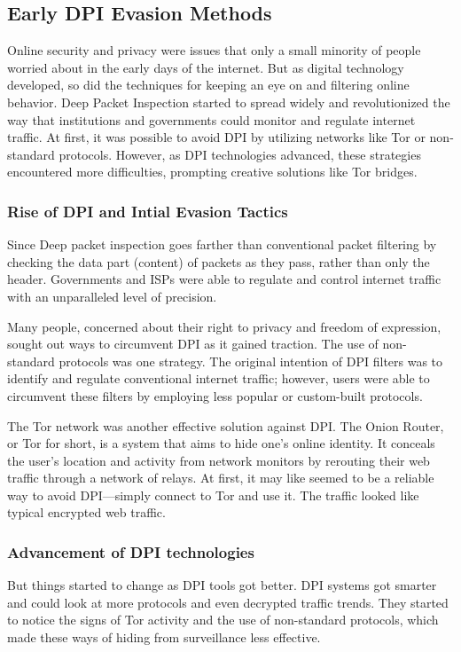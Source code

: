 \documentclass[12pt, fleqn, a4paper]{article}
\begin{document}
\subsection{Early DPI Evasion Methods}
Online security and privacy were issues that only a small minority of people worried about in the early days of the internet. But as digital technology developed, so did the techniques for keeping an eye on and filtering online behavior. Deep Packet Inspection started to spread widely and revolutionized the way that institutions and governments could monitor and regulate internet traffic. At first, it was possible to avoid DPI by utilizing networks like Tor or non-standard protocols. However, as DPI technologies advanced, these strategies encountered more difficulties, prompting creative solutions like Tor bridges. \citep{sechist}
\subsubsection{Rise of DPI and Intial Evasion Tactics}
Since Deep packet inspection goes farther than conventional packet filtering by checking the data part (content) of packets as they pass, rather than only the header. Governments and ISPs were able to regulate and control internet traffic with an unparalleled level of precision.

Many people, concerned about their right to privacy and freedom of expression, sought out ways to circumvent DPI as it gained traction. The use of non-standard protocols was one strategy. The original intention of DPI filters was to identify and regulate conventional internet traffic; however, users were able to circumvent these filters by employing less popular or custom-built protocols.

The Tor network was another effective solution against DPI. The Onion Router, or Tor for short, is a system that aims to hide one's online identity. It conceals the user's location and activity from network monitors by rerouting their web traffic through a network of relays. At first, it may like seemed to be a reliable way to avoid DPI—simply connect to Tor and use it. The traffic looked like typical encrypted web traffic.

\subsubsection{Advancement of DPI technologies}
But things started to change as DPI tools got better. DPI systems got smarter and could look at more protocols and even decrypted traffic trends. They started to notice the signs of Tor activity and the use of non-standard protocols, which made these ways of hiding from surveillance less effective.
\end{document}
